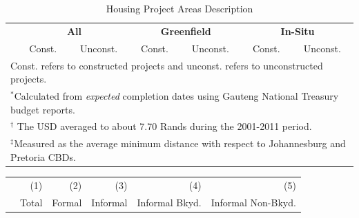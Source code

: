 \documentclass[12pt]{article}
\begin{document}
\vspace{0mm}
\begin{table}[h!]
\centering
\caption{Housing Project Areas Description}\label{table:projectdescriptives}
\vspace{0mm}
\begin{tabular}{l*{1}{cccccc}}
\toprule
  & \multicolumn{2}{c}{\textbf{All}}& \multicolumn{2}{c}{\textbf{Greenfield}}  & \multicolumn{2}{c}{\textbf{In-Situ}}   \\
  &Const. & Unconst. &Const. & Unconst.   & Const. & Unconst. \\
\midrule

\bottomrule
\multicolumn{7}{l}{\scriptsize Const. refers to constructed projects and unconst. refers to unconstructed projects.}\\[-.5em]
\multicolumn{7}{l}{\scriptsize $^*$Calculated from {\it expected} completion dates using Gauteng National Treasury budget reports.}\\[-.5em]
\multicolumn{7}{l}{\scriptsize $^\dagger$ The USD averaged to about 7.70 Rands during the 2001-2011 period.}\\[-.5em]
\multicolumn{7}{l}{\scriptsize $^\ddagger$Measured as the average minimum distance with respect to Johannesburg and Pretoria CBDs. } \\[-.5em]
\end{tabular}
\end{table} 



\begin{table}
\begin{tabular}{lDDDDD}
\toprule
 & \small (1) & \small (2)  & \small (3) & \small (4) & \small (5) \\
 & Total & Formal  & Informal & Informal Bkyd. & Informal Non-Bkyd. \\ \midrule

\bottomrule
\end{tabular}
\end{table}


\begin{table}
\end{table}
\end{document}
